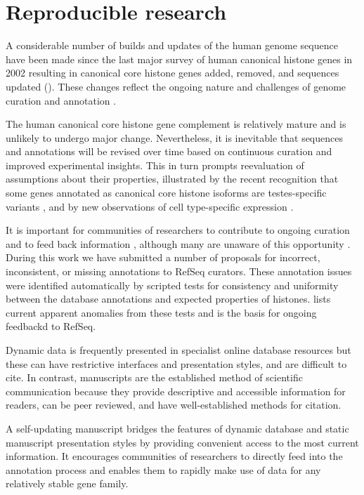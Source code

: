 \section{Reproducible research}
\label{sec:reproducible}

  A considerable number of builds and updates of the human genome sequence have been made
  since the last major survey of human canonical histone genes in 2002 \citep{Marzluff02}
  resulting in
  \AddedSinceReference{} canonical core histone genes added,
  \RemovedSinceReference{} removed,
  and \SequencesUpdatedSinceReference{}
  sequences updated ().
  These changes reflect the ongoing nature and challenges of
  genome curation and annotation \citep{BorkKoonin1998}.

  The human canonical core histone gene complement is relatively mature
  and is unlikely to undergo major change.
  Nevertheless, it is inevitable that sequences and annotations will be revised over time
  based on continuous curation and improved experimental insights.
  This in turn prompts reevaluation of assumptions about their properties,
  illustrated by the recent recognition that some genes 
  annotated as canonical core histone isoforms are testes-specific variants \citep{Talbert2012},
  and by new observations of cell type-specific expression \citep{Molden2015}.

  It is important for communities of researchers to contribute
  to ongoing curation and to feed back information \citep{SteinNRG2001},
  although many are unaware of this opportunity \citep{HollidaySPR2015}.
  During this work we have submitted a number of proposals 
  for incorrect, inconsistent, or missing annotations to RefSeq curators.
  These annotation issues were identified automatically
  by scripted tests for consistency and uniformity 
  between the database annotations and expected properties of histones.
   lists current apparent anomalies from these tests
  and is the basis for ongoing feedbackd to RefSeq.

  Dynamic data is frequently presented in specialist online database resources
  but these can have restrictive interfaces and presentation styles, and are difficult to cite.
  In contrast, manuscripts are the established method of scientific communication
  because they provide descriptive and accessible information for readers, 
  can be peer reviewed, and have well-established methods for citation.

  A self-updating manuscript bridges the features of dynamic database and static manuscript
  presentation styles by providing convenient access to the most current information.
  It encourages communities of researchers to directly feed into the annotation process
  and enables them to rapidly make use of data for any relatively stable gene family.

